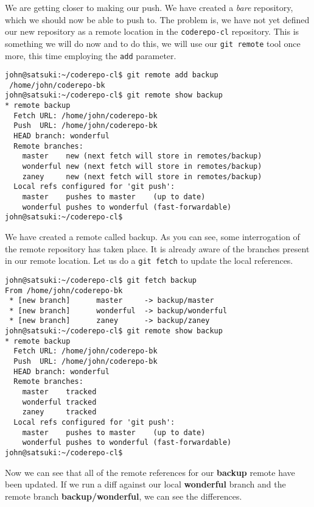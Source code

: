 We are getting closer to making our push.  We have created a \emph{bare} repository, which we should now be able to push to.  The problem is, we have not yet defined our new repository as a remote location in the \texttt{coderepo-cl} repository.  This is something we will do now and to do this, we will use our \texttt{git remote} tool once more, this time employing the \texttt{add} parameter.

\begin{Verbatim}[frame=leftline,framerule=1mm,fontsize=\relsize{-3}] 
john@satsuki:~/coderepo-cl$ git remote add backup 
 /home/john/coderepo-bk
john@satsuki:~/coderepo-cl$ git remote show backup
* remote backup
  Fetch URL: /home/john/coderepo-bk
  Push  URL: /home/john/coderepo-bk
  HEAD branch: wonderful
  Remote branches:
    master    new (next fetch will store in remotes/backup)
    wonderful new (next fetch will store in remotes/backup)
    zaney     new (next fetch will store in remotes/backup)
  Local refs configured for 'git push':
    master    pushes to master    (up to date)
    wonderful pushes to wonderful (fast-forwardable)
john@satsuki:~/coderepo-cl$ 
\end{Verbatim}

We have created a remote called backup.  As you can see, some interrogation of the remote repository has taken place.  It is already aware of the branches present in our remote location.  Let us do a \texttt{git fetch} to update the local references.

\begin{Verbatim}[frame=leftline,framerule=1mm,fontsize=\relsize{-3}] 
john@satsuki:~/coderepo-cl$ git fetch backup
From /home/john/coderepo-bk
 * [new branch]      master     -> backup/master
 * [new branch]      wonderful  -> backup/wonderful
 * [new branch]      zaney      -> backup/zaney
john@satsuki:~/coderepo-cl$ git remote show backup
* remote backup
  Fetch URL: /home/john/coderepo-bk
  Push  URL: /home/john/coderepo-bk
  HEAD branch: wonderful
  Remote branches:
    master    tracked
    wonderful tracked
    zaney     tracked
  Local refs configured for 'git push':
    master    pushes to master    (up to date)
    wonderful pushes to wonderful (fast-forwardable)
john@satsuki:~/coderepo-cl$ 
\end{Verbatim}

Now we can see that all of the remote references for our \textbf{backup} remote have been updated.  If we run a diff against our local \textbf{wonderful} branch and the remote branch \textbf{backup/wonderful}, we can see the differences.

